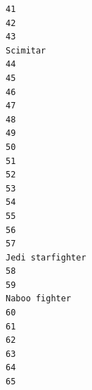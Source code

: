 \documentclass[
]{article}
\begin{document}
\begin{verbatim}
41                                                                                                         
42                                                                                                         
43                                                                                                 Scimitar
44                                                                                                         
45                                                                                                         
46                                                                                                         
47                                                                                                         
48                                                                                                         
49                                                                                                         
50                                                                                                         
51                                                                                                         
52                                                                                                         
53                                                                                                         
54                                                                                                         
55                                                                                                         
56                                                                                                         
57                                                                                         Jedi starfighter
58                                                                                                         
59                                                                                            Naboo fighter
60                                                                                                         
61                                                                                                         
62                                                                                                         
63                                                                                                         
64                                                                                                         
65                                                                                                         

\end{verbatim}
\end{document}
